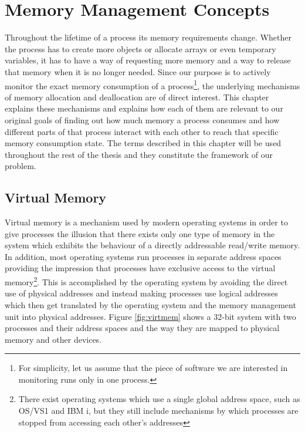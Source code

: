 \chapter{Memory Management Concepts}
\label{chapter:memmgmt}

Throughout the lifetime of a process its memory requirements change. Whether the process has to create more objects or allocate arrays or even temporary variables, it has to have a way of requesting more memory and a way to release that memory when it is no longer needed. Since our purpose is to actively monitor the exact memory consumption of a process\footnote{For simplicity, let us assume that the piece of software we are interested in monitoring runs only in one process.}, the underlying mechanisms of memory allocation and deallocation are of direct interest.  This chapter explains these mechanisms and explains how each of them are relevant to our original goals of finding out how much memory a process consumes and how different parts of that process interact with each other to reach that specific memory consumption state. The terms described in this chapter will be used throughout the rest of the thesis and they constitute the framework of our problem.

\newpage

\section{Virtual Memory}
\label{section:virtmem}

Virtual memory is a mechanism used by modern operating systems in order to give processes the illusion that there exists only one type of memory in the system which exhibits the behaviour of a directly addressable read/write memory. In addition, most operating systems run processes in separate address spaces providing the impression that processes have exclusive access to the virtual memory\footnote{There exist operating systems which use a single global address space, such as OS/VS1 and IBM i, but they still include mechanisms by which processes are stopped from accessing each other's addresses}. This is accomplished by the operating system by avoiding the direct use of physical addresses and instead making processes use logical addresses which then get translated by the operating system and the memory management unit into physical addresses. Figure \ref{fig:virtmem} shows a 32-bit system with two processes and their address spaces and the way they are mapped to physical memory and other devices.


